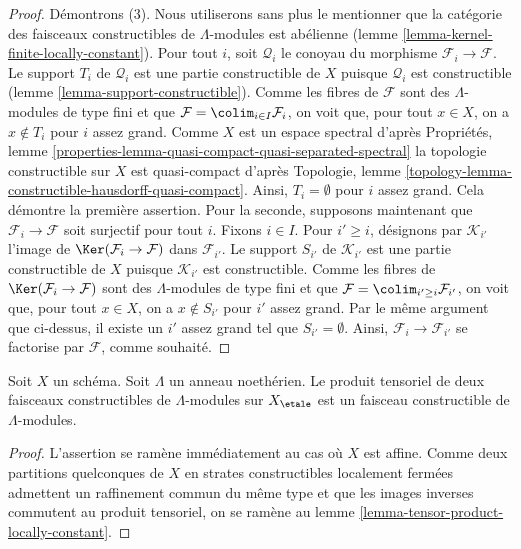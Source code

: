 \begin{proof}
\medskip\noindent
Démontrons (3). Nous utiliserons sans plus le mentionner que la catégorie des
faisceaux constructibles de $\Lambda$-modules est abélienne
(lemme \ref{lemma-kernel-finite-locally-constant}).
Pour tout $i$, soit $\mathcal{Q}_i$ le conoyau du morphisme
$\mathcal{F}_i \to \mathcal{F}$. Le support $T_i$ de $\mathcal{Q}_i$
est une partie constructible de $X$ puisque $\mathcal{Q}_i$ est constructible
(lemme \ref{lemma-support-constructible}).
Comme les fibres de $\mathcal{F}$ sont des $\Lambda$-modules de type fini
et que $\mathcal{F} = \colim_{i \in I} \mathcal{F}_i$, on voit
que, pour tout $x \in X$, on a $x \not \in T_i$ pour $i$ assez grand.
Comme $X$ est un espace spectral d'après Propriétés, lemme
\ref{properties-lemma-quasi-compact-quasi-separated-spectral}
la topologie constructible sur $X$ est quasi-compact d'après
Topologie, lemme \ref{topology-lemma-constructible-hausdorff-quasi-compact}.
Ainsi, $T_i = \emptyset$ pour $i$ assez grand. Cela démontre la première
assertion. Pour la seconde, supposons maintenant que
$\mathcal{F}_i \to \mathcal{F}$ soit surjectif pour tout $i$.
Fixons $i \in I$. Pour $i' \geq i$, désignons par $\mathcal{K}_{i'}$
l'image de $\Ker(\mathcal{F}_i \to \mathcal{F})$ dans $\mathcal{F}_{i'}$.
Le support $S_{i'}$ de $\mathcal{K}_{i'}$
est une partie constructible de $X$ puisque $\mathcal{K}_{i'}$ est constructible.
Comme les fibres de $\Ker(\mathcal{F}_i \to \mathcal{F})$
sont des $\Lambda$-modules de type fini et que
$\mathcal{F} = \colim_{i' \geq i} \mathcal{F}_{i'}$, on voit
que, pour tout $x \in X$, on a $x \not \in S_{i'}$ pour $i'$ assez grand.
Par le même argument que ci-dessus, il existe un $i'$ assez grand
tel que $S_{i'} = \emptyset$. Ainsi, $\mathcal{F}_i \to \mathcal{F}_{i'}$
se factorise par $\mathcal{F}$, comme souhaité.
\end{proof}

\begin{lemma}
\label{lemma-tensor-product-constructible}
Soit $X$ un schéma. Soit $\Lambda$ un anneau noethérien.
Le produit tensoriel de deux faisceaux constructibles de $\Lambda$-modules
sur $X_\etale$ est un faisceau constructible de $\Lambda$-modules.
\end{lemma}

\begin{proof}
L'assertion se ramène immédiatement au cas où $X$ est affine.
Comme deux partitions quelconques de $X$ en strates constructibles localement
fermées admettent un raffinement commun du même type et
que les images inverses commutent au produit tensoriel, on se ramène au
lemme \ref{lemma-tensor-product-locally-constant}.
\end{proof}

